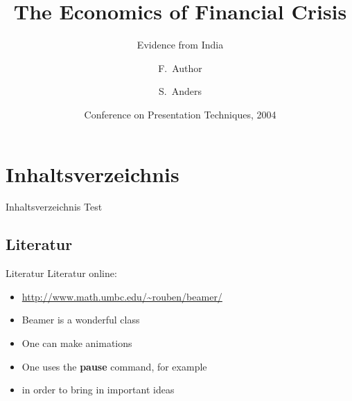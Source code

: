 \documentclass[10pt]{beamer} %
\title[Crisis] %
{The Economics of Financial Crisis}
\subtitle{Evidence from India}
\author[Author, Anders] %
{F.~Author\inst{1} \and S.~Anders\inst{2}}
\institute[Universities Here and There] %
{
  \inst{1}%
  Institute of Computer Science\\
  University Here
  \and
  \inst{2}%
  Institute of Theoretical Philosophy\\
  University There
}
\date[KPT 2004] %
{Conference on Presentation Techniques, 2004}
\begin{document}
\begin{frame}
\titlepage
\end{frame}


\section{Inhaltsverzeichnis}
\begin{frame}{Inhaltsverzeichnis}
Test
\end{frame}


\subsection{Literatur}
\begin{frame}{Literatur}
Literatur online: 
\begin{itemize}
\item \url{http://www.math.umbc.edu/~rouben/beamer/}
\end{itemize}
\end{frame}

\begin{frame}

\begin{itemize}
\item Beamer is a wonderful class
\pause \item One can make animations
\pause \item One uses the \textbf{pause} command, for example
\pause \item in order to bring in important ideas
\end{itemize}

\end{frame}
\end{document}
